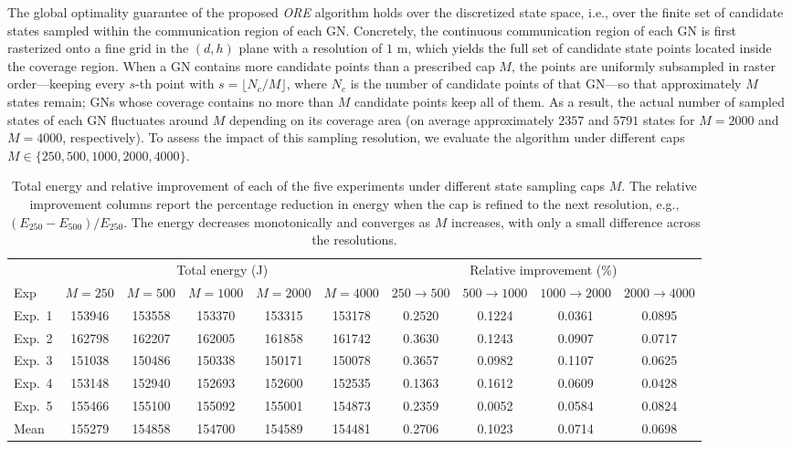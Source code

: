 The global optimality guarantee of the proposed \textit{ORE} algorithm holds over the discretized state space, i.e., over the finite set of candidate states sampled within the communication region of each GN. Concretely, the continuous communication region of each GN is first rasterized onto a fine grid in the $(d,h)$ plane with a resolution of $1$ m, which yields the full set of candidate state points located inside the coverage region. When a GN contains more candidate points than a prescribed cap $M$, the points are uniformly subsampled in raster order---keeping every $s$-th point with $s=\lfloor N_c/M \rfloor$, where $N_c$ is the number of candidate points of that GN---so that approximately $M$ states remain; GNs whose coverage contains no more than $M$ candidate points keep all of them. As a result, the actual number of sampled states of each GN fluctuates around $M$ depending on its coverage area (on average approximately $2357$ and $5791$ states for $M=2000$ and $M=4000$, respectively). To assess the impact of this sampling resolution, we evaluate the algorithm under different caps $M \in \{250, 500, 1000, 2000, 4000\}$.

\begin{table}[]
\caption{Total energy and relative improvement of each of the five experiments under different state sampling caps $M$. The relative improvement columns report the percentage reduction in energy when the cap is refined to the next resolution, e.g., $(E_{250}-E_{500})/E_{250}$. The energy decreases monotonically and converges as $M$ increases, with only a small difference across the resolutions.}\label{tbl:sensitivity}
\begin{tabular*}{\textwidth}{l ccccc cccc}
\toprule
 & \multicolumn{5}{c}{Total energy (J)} & \multicolumn{4}{c}{Relative improvement (\%)} \\
\cmidrule(lr){2-6} \cmidrule(lr){7-10}
 Exp & $M=250$ & $M=500$ & $M=1000$ & $M=2000$ & $M=4000$ & $250\!\to\!500$ & $500\!\to\!1000$ & $1000\!\to\!2000$ & $2000\!\to\!4000$ \\
\midrule
 Exp.\ 1 & 153946 & 153558 & 153370 & 153315 & 153178 & 0.2520 & 0.1224 & 0.0361 & 0.0895 \\
 Exp.\ 2 & 162798 & 162207 & 162005 & 161858 & 161742 & 0.3630 & 0.1243 & 0.0907 & 0.0717 \\
 Exp.\ 3 & 151038 & 150486 & 150338 & 150171 & 150078 & 0.3657 & 0.0982 & 0.1107 & 0.0625 \\
 Exp.\ 4 & 153148 & 152940 & 152693 & 152600 & 152535 & 0.1363 & 0.1612 & 0.0609 & 0.0428 \\
 Exp.\ 5 & 155466 & 155100 & 155092 & 155001 & 154873 & 0.2359 & 0.0052 & 0.0584 & 0.0824 \\
\midrule
 Mean & 155279 & 154858 & 154700 & 154589 & 154481 & 0.2706 & 0.1023 & 0.0714 & 0.0698 \\
\bottomrule
\end{tabular*}
\end{table}

